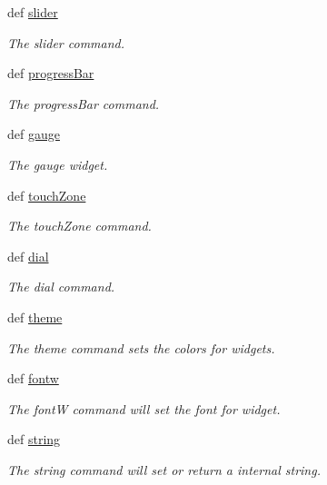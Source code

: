 \begin{DoxyCompactItemize}
def \hyperlink{group___widgets_ga93ee96540f5ffc5c4704f60592074d80}{slider}
\begin{DoxyCompactList}\small\item\em The slider command. \end{DoxyCompactList}\item 
def \hyperlink{group___widgets_ga9eeb62ec0060e5ba57e42986b2d555ae}{progress\-Bar}
\begin{DoxyCompactList}\small\item\em The progress\-Bar command. \end{DoxyCompactList}\item 
def \hyperlink{group___widgets_gab71489d4d59dfc595166ed91ff97ed3b}{gauge}
\begin{DoxyCompactList}\small\item\em The gauge widget. \end{DoxyCompactList}\item 
def \hyperlink{group___widgets_gaeb901f189e33956b4cd51fbd78bcf957}{touch\-Zone}
\begin{DoxyCompactList}\small\item\em The touch\-Zone command. \end{DoxyCompactList}\item 
def \hyperlink{group___widgets_ga0122f7d8c41bb07221be8a778ca8fd53}{dial}
\begin{DoxyCompactList}\small\item\em The dial command. \end{DoxyCompactList}\item 
def \hyperlink{group___widgets_ga334488d30595cf0dd9e2742c65558e2c}{theme}
\begin{DoxyCompactList}\small\item\em The theme command sets the colors for widgets. \end{DoxyCompactList}\item 
def \hyperlink{group___widgets_ga0efc2d431900e2b77a30e19bb556fb3a}{fontw}
\begin{DoxyCompactList}\small\item\em The font\-W command will set the font for widget. \end{DoxyCompactList}\item 
def \hyperlink{group___widgets_gae2b2686b92f93d6fc84de7a19518a89f}{string}
\begin{DoxyCompactList}\small\item\em The string command will set or return a internal string. \end{DoxyCompactList}\item 

\end{DoxyCompactItemize}
